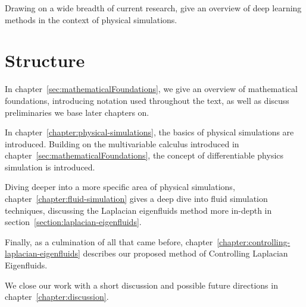 Drawing on a wide breadth of current research, \citet{pbdl} give an overview of
deep learning methods in the context of physical simulations. 

\section{Structure}
In chapter~\ref{sec:mathematicalFoundations}, we give an overview of
mathematical foundations, introducing notation used throughout the text, as well
as discuss  preliminaries we base later chapters on. 

In chapter~\ref{chapter:physical-simulations}, the basics of physical
simulations are introduced. Building on the multivariable calculus introduced in
chapter~\ref{sec:mathematicalFoundations}, the concept of differentiable physics
simulation is introduced. 

Diving deeper into a more specific area of physical simulations,
chapter~\ref{chapter:fluid-simulation} gives a deep dive into fluid simulation
techniques, discussing the Laplacian eigenfluids method more in-depth in
section~\ref{section:laplacian-eigenfluids}. 

Finally, as a culmination of all that came before,
chapter~\ref{chapter:controlling-laplacian-eigenfluids} describes our proposed
method of Controlling Laplacian Eigenfluids. 

We close our work with a short discussion and possible future directions in
chapter~\ref{chapter:discussion}.
